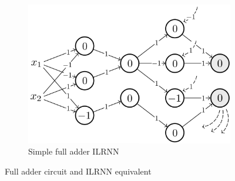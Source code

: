 \documentclass{article}
\def\layersep{2.5cm}
\begin{document}
\begin{figure}[t]
\begin{subfigure}[t]{0.5\textwidth}
    
    
    
    
    

        \includegraphics[width=\textwidth]{full-adder-ilrnn}
        \caption{Simple full adder ILRNN}
    \end{subfigure}
    \caption{Full adder circuit and ILRNN equivalent}
    \label{fulladder}
\end{figure}
\end{document}

